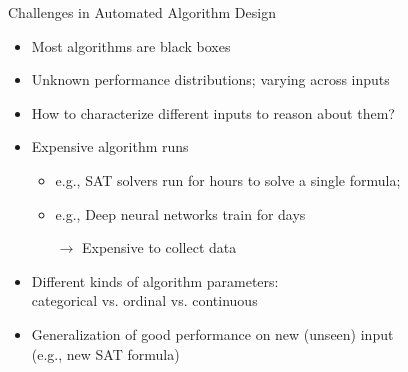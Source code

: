 \begin{frame}[c]{Challenges in Automated Algorithm Design}

\begin{itemize}
  \item Most algorithms are black boxes
  \item Unknown performance distributions; varying across inputs
  \item How to characterize different inputs to reason about them?
  \medskip
  \pause
  \item Expensive algorithm runs
  \begin{itemize}
    \item e.g., SAT solvers run for hours to solve a single formula;
    \item e.g., Deep neural networks train for days
    \item[$\to$] Expensive to collect data
  \end{itemize}
  \medskip
  \pause
  \item Different kinds of algorithm parameters:\\categorical vs. ordinal vs. continuous 
  \item Generalization of good performance on new (unseen) input\\(e.g., new SAT formula)
\end{itemize}

\end{frame}

